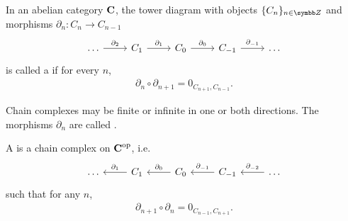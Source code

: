 \begin{definition}\label{def:chain_complex}\cite{nLab:chain_complex}
  In an abelian category \( \operatorname{\mathbf{C}} \), the tower diagram with objects \( \{ C_n \}_{n \in \BB{Z}} \) and morphisms \( \partial_n: C_n \to C_{n-1} \)
  \begin{equation}\label{def:chain_complex/chain_diagram}
    \begin{tikzcd}[baseline=(current bounding box.center)]
      \ldots \arrow[r, "\partial_2"] & C_1 \arrow[r, "\partial_1"] & C_0 \arrow[r, "\partial_0"] & C_{-1} \arrow[r, "\partial_{-1}"] & \ldots
    \end{tikzcd}
  \end{equation}
  is called a  if for every \( n \),
  \begin{align*}
    \partial_n \circ \partial_{n+1} = 0_{C_{n+1},C_{n-1}}.
  \end{align*}

  Chain complexes may be finite or infinite in one or both directions. The morphisms \( \partial_n \) are called .

  A  is a chain complex on \( \operatorname{\mathbf{C}}^{\operatorname{op}} \), i.e.
  \begin{equation}\label{def:chain_complex/cochain_diagram}
    \begin{tikzcd}[baseline=(current bounding box.center)]
      \ldots & C_1 \arrow[l, "\partial_1"'] & C_0 \arrow[l, "\partial_0"'] & C_{-1} \arrow[l, "\partial_{-1}"'] & \ldots \arrow[l, "\partial_{-2}"']
    \end{tikzcd}
  \end{equation}
  such that for any \( n \),
  \begin{align*}
    \partial_{n+1} \circ \partial_n = 0_{C_{n-1},C_{n+1}}.
  \end{align*}
\end{definition}
